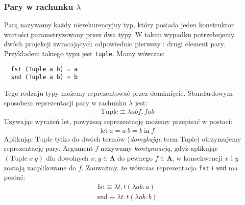 \subsubsection{Pary w rachunku \(\lambda\)}\label{subsec:pairs}
Parą nazywamy każdy nierekurencyjny typ, który posiada jeden konstruktor wartości parametryzowany przez dwa typy. W takim wypadku potrzebujemy dwóch projekcji zwracających odpowiednio pierwszy i drugi element pary. Przykładem takiego typu jest \texttt{Tuple}. Mamy wówczas:
\begin{verbatim}
  fst (Tuple a b) = a
  snd (Tuple a b) = b
\end{verbatim}
Tego rodzaju typy możemy reprezentować przez domknięcie. Standardowym sposobem reprezentacji pary w rachunku \(\lambda\) jest:
\begin{align*}
  \mathrm{Tuple}\equiv\lambda a b f .\,f a b
\end{align*}
Uzywając wyrażeń let, powyższą reprezentację możemy przepisać w postaci:
\begin{align*}
  \mathrm{let}\ a = a\ b = b\ \mathrm{in}\ f
\end{align*}
Aplikując \(\mathrm{Tuple}\) tylko do dwóch termów (\emph{domykając} term Tuple) otrzymujemy reprezentację pary. Argument \(f\) nazywamy \emph{kontynuacją}, gdyż aplikując \((\mathrm{Tuple}\ x\ y)\) dla dowolnych \(x, y\in\mathbf{\Lambda}\) do pewnego \(f\in\mathbf{\Lambda}\), w konsekwencji \(x\) i \(y\) zostają zaaplikowane do \(f\).
Zauważmy, że wówczas reprezentacja \texttt{fst} i \texttt{snd} ma postać:
\begin{align*}
  \mathrm{fst} \equiv \lambda t.\,t(\lambda a b.\,a) \\
  \mathrm{snd} \equiv \lambda t.\,t(\lambda a b.\,b)
\end{align*}

